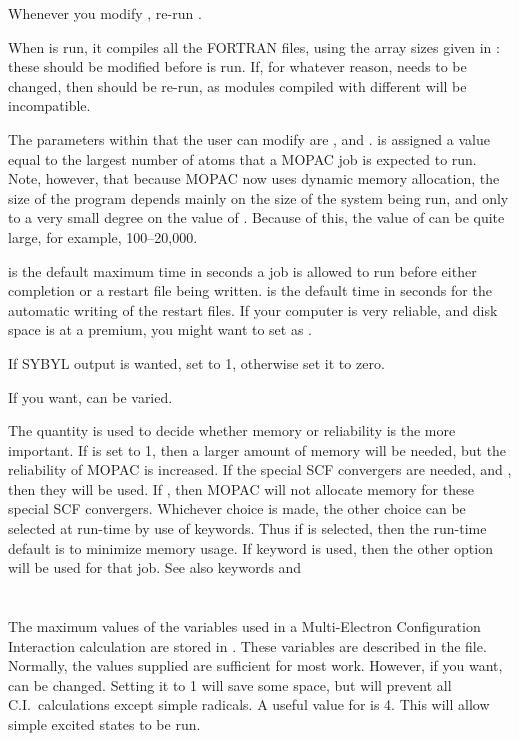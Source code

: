 Whenever you modify , re-run .

When  is run, it compiles  all the FORTRAN files, using  the  array 
sizes given  in :  these should be modified  before 
is run. If, for whatever reason,  needs to be changed, then 
 should  be  re-run, as modules compiled with different
 will be incompatible.

 The parameters within  that the 
user  can  modify  are ,   and .   
 is assigned a value equal to the largest number of atoms that a
MOPAC  job  is  expected  to run. Note, however, that because MOPAC now uses
dynamic memory allocation, the size of the program depends mainly on the size
of the system being run, and only to a very small degree on the value of
.  Because of this, the value of  can be quite large,
for example, 100--20,000.

 is the default maximum time in seconds a job is allowed to  run 
before  either completion  or a restart file being written.   is
the default time in seconds for the automatic writing of  the  restart 
files.   If  your computer  is  very  reliable,  and disk space is at a
premium, you might want to set  as .

 If SYBYL
output is wanted, set  to 1,  otherwise  set  it  to zero.

If you want,  can be varied. 

The quantity  is used to decide whether memory or reliability is
the more important.  If  is set to 1, then a larger amount of 
memory will be needed, but the reliability of MOPAC is increased.  If the
special SCF convergers are needed, and , then they will be used. 
If , then MOPAC will not allocate memory for these special SCF
convergers.  Whichever choice is made, the other choice can be selected at
run-time by use of keywords. Thus if  is selected, then the
run-time default is to minimize memory usage.  If keyword  is used,
then the other option will be used for that job.  See also keywords 
and 

\section{} \label{mecih}
The maximum values of the variables used in a Multi-Electron Configuration
Interaction calculation are stored in .  These variables are
described in the file. Normally, the values supplied are sufficient for most
work.  However, if you want,   can be changed.  Setting it to 1
will save  some space, but will prevent all C.I.\ calculations except simple
radicals. A useful value for  is 4.  This will allow simple excited
states to be run.

